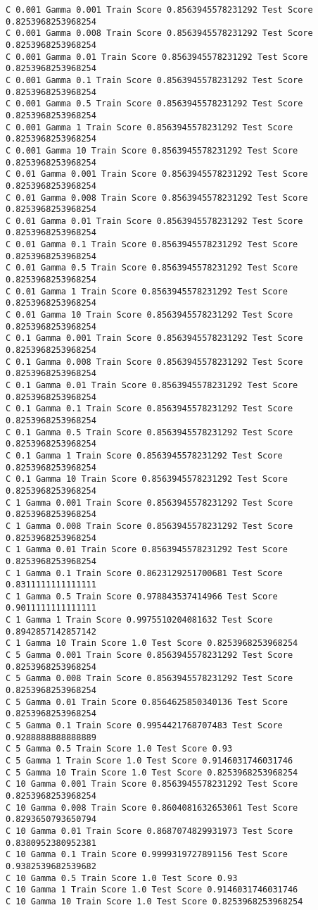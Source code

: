 \documentclass[11pt]{article}
\begin{document}
    \begin{Verbatim}[commandchars=\\\{\}]
C 0.001 Gamma 0.001 Train Score 0.8563945578231292 Test Score 0.8253968253968254
C 0.001 Gamma 0.008 Train Score 0.8563945578231292 Test Score 0.8253968253968254
C 0.001 Gamma 0.01 Train Score 0.8563945578231292 Test Score 0.8253968253968254
C 0.001 Gamma 0.1 Train Score 0.8563945578231292 Test Score 0.8253968253968254
C 0.001 Gamma 0.5 Train Score 0.8563945578231292 Test Score 0.8253968253968254
C 0.001 Gamma 1 Train Score 0.8563945578231292 Test Score 0.8253968253968254
C 0.001 Gamma 10 Train Score 0.8563945578231292 Test Score 0.8253968253968254
C 0.01 Gamma 0.001 Train Score 0.8563945578231292 Test Score 0.8253968253968254
C 0.01 Gamma 0.008 Train Score 0.8563945578231292 Test Score 0.8253968253968254
C 0.01 Gamma 0.01 Train Score 0.8563945578231292 Test Score 0.8253968253968254
C 0.01 Gamma 0.1 Train Score 0.8563945578231292 Test Score 0.8253968253968254
C 0.01 Gamma 0.5 Train Score 0.8563945578231292 Test Score 0.8253968253968254
C 0.01 Gamma 1 Train Score 0.8563945578231292 Test Score 0.8253968253968254
C 0.01 Gamma 10 Train Score 0.8563945578231292 Test Score 0.8253968253968254
C 0.1 Gamma 0.001 Train Score 0.8563945578231292 Test Score 0.8253968253968254
C 0.1 Gamma 0.008 Train Score 0.8563945578231292 Test Score 0.8253968253968254
C 0.1 Gamma 0.01 Train Score 0.8563945578231292 Test Score 0.8253968253968254
C 0.1 Gamma 0.1 Train Score 0.8563945578231292 Test Score 0.8253968253968254
C 0.1 Gamma 0.5 Train Score 0.8563945578231292 Test Score 0.8253968253968254
C 0.1 Gamma 1 Train Score 0.8563945578231292 Test Score 0.8253968253968254
C 0.1 Gamma 10 Train Score 0.8563945578231292 Test Score 0.8253968253968254
C 1 Gamma 0.001 Train Score 0.8563945578231292 Test Score 0.8253968253968254
C 1 Gamma 0.008 Train Score 0.8563945578231292 Test Score 0.8253968253968254
C 1 Gamma 0.01 Train Score 0.8563945578231292 Test Score 0.8253968253968254
C 1 Gamma 0.1 Train Score 0.8623129251700681 Test Score 0.8311111111111111
C 1 Gamma 0.5 Train Score 0.978843537414966 Test Score 0.9011111111111111
C 1 Gamma 1 Train Score 0.9975510204081632 Test Score 0.8942857142857142
C 1 Gamma 10 Train Score 1.0 Test Score 0.8253968253968254
C 5 Gamma 0.001 Train Score 0.8563945578231292 Test Score 0.8253968253968254
C 5 Gamma 0.008 Train Score 0.8563945578231292 Test Score 0.8253968253968254
C 5 Gamma 0.01 Train Score 0.8564625850340136 Test Score 0.8253968253968254
C 5 Gamma 0.1 Train Score 0.9954421768707483 Test Score 0.9288888888888889
C 5 Gamma 0.5 Train Score 1.0 Test Score 0.93
C 5 Gamma 1 Train Score 1.0 Test Score 0.9146031746031746
C 5 Gamma 10 Train Score 1.0 Test Score 0.8253968253968254
C 10 Gamma 0.001 Train Score 0.8563945578231292 Test Score 0.8253968253968254
C 10 Gamma 0.008 Train Score 0.8604081632653061 Test Score 0.8293650793650794
C 10 Gamma 0.01 Train Score 0.8687074829931973 Test Score 0.8380952380952381
C 10 Gamma 0.1 Train Score 0.9999319727891156 Test Score 0.9382539682539682
C 10 Gamma 0.5 Train Score 1.0 Test Score 0.93
C 10 Gamma 1 Train Score 1.0 Test Score 0.9146031746031746
C 10 Gamma 10 Train Score 1.0 Test Score 0.8253968253968254

    \end{Verbatim}
\end{document}
